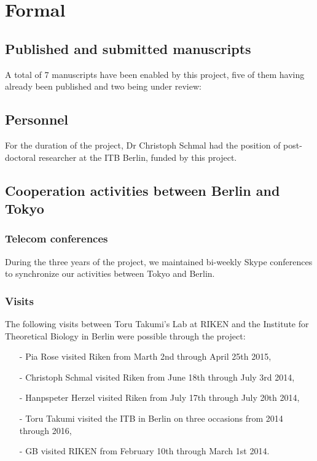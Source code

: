 \documentclass[a4paper]{article}
\begin{document}








\newpage

\section{Formal}

\subsection{Published and submitted manuscripts}
A total of 7 manuscripts have been enabled by this project, five of
them having already been published and two being under review:
\cite{bordyugov2015tuning,schmal2015theoretical,kondoff2015modeling,schmal2017moran,wagner2017plant,myung2017choroid,schmal2017measuring}


\subsection{Personnel}
For the duration of the project, Dr Christoph Schmal had the position
of post-doctoral researcher at the ITB Berlin, funded by this project.

\subsection{Cooperation activities between Berlin and Tokyo}

\subsubsection{Telecom conferences}
During the three years of the project, we maintained bi-weekly Skype
conferences to synchronize our activities between Tokyo and Berlin.

\subsubsection{Visits}
The following visits between Toru Takumi's Lab at RIKEN and the
Institute for Theoretical Biology in Berlin were possible through the
project:
\begin{itemize}
  \item[-] Pia Rose visited Riken from Marth 2nd through April 25th 2015,
  \item[-] Christoph Schmal visited Riken from June 18th through July 3rd
  2014,
  \item[-] Hanpspeter Herzel visited Riken from July 17th through July
  20th 2014,
  \item[-] Toru Takumi visited the ITB in Berlin on three occasions from
  2014 through 2016,
  \item[-] GB visited RIKEN from February 10th through March 1st 2014.
\end{itemize}
\end{document}
